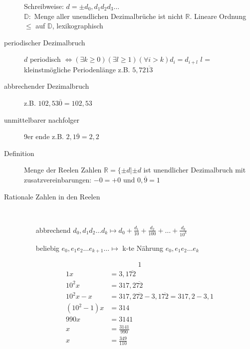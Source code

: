 \documentclass[12pt,a4paper]{article}
\begin{document}
\begin{description}
\begin{itemize}
		\end{itemize}
		Schreibweise: $d = \pm d_0,d_1d_2d_3\dots$\\
		$\mathbb{D} :$ Menge aller unendlichen Dezimalbrüche ist nicht $\mathbb{R}$. Lineare Ordnung $\leq$ auf $\mathbb{D}$, lexikographisch
	\item[periodischer Dezimalbruch] $d$ periodisch
		$\Leftrightarrow (\exists k \geq 0)(\exists l \geq 1) (\forall i > k) d_i= d_{i + l}$ $l$ = kleinstmögliche Periodenlänge z.B. $5{,}72\overline{13}$
	\item[abbrechender Dezimalbruch] z.B. $102{,}53\overline{0} = 102{,}53$
	\item[unmittelbarer nachfolger] 9er ende z.B. $2{,}1\overline{9} = 2,2$
	\item[Definition] Menge der Reelen Zahlen $\mathbb{R} = \lbrace \pm d | \pm d $ ist unendlicher Dezimalbruch mit zusatzvereinbarungen: $ -0 = +0 \textrm{ und } 0{,}\overline{9} = 1$
	\item[Rationale Zahlen in den Reelen] \
		\begin{itemize}
			\item[abbrechend] $d_0{,}d_1 d_2 \dots d_k \longmapsto d_0 + \frac{d_1}{10}+\frac{d_2}{100} + \dots + \frac{d_k}{10^k}$
			\item[beliebig] $e_0{,}e_1 e_2 \dots e_{k + 1} \dots \longmapsto$ k-te Nährung $e_0{,}e_1 e_2 \dots e_k$
		\end{itemize}
		\begin{alignat*}{1}
		\end{alignat*}
		\begin{alignat*}{1}
			x         & = 3{,}1\overline{72}                                          \\
			10^2x     & = 317{,}2\overline{72}                                        \\
			10^2x-x   & = 317{,}2\overline{72} - 3{,}1\overline{72} = 317{,}2 - 3{,}1 \\
			(10^2-1)x & = 314                                                         \\
			990x      & = 3141                                                        \\
			x         & = \frac{3141}{990}                                            \\
			x         & = \frac{349}{110}                                             \\
		\end{alignat*}

\end{description}
\end{document}
